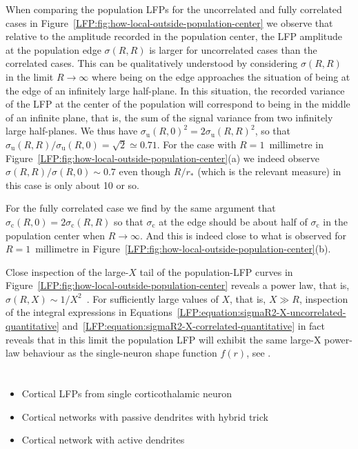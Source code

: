 When comparing the population LFPs for the uncorrelated and fully correlated cases in
Figure~\ref{LFP:fig:how-local-outside-population-center} we observe that 
relative to the amplitude recorded in the population center, the LFP amplitude at the 
population edge $\sigma(R,R)$ is larger for uncorrelated cases than the correlated cases.
This can be qualitatively understood by considering $\sigma(R,R)$ in the limit $R \rightarrow \infty$ where
being on the edge approaches the situation of being at the edge of an infinitely large half-plane. In this
situation, the recorded variance of the LFP at the center of the population will correspond to being in the middle
of an infinite plane, that is, the sum of the signal variance from two infinitely large half-planes. We thus have
$\sigma_\text{u}(R,0)^2=2\sigma_\text{u}(R,R)^2$, so that  $\sigma_\text{u}(R,R)/\sigma_\text{u}(R,0)=\sqrt{2} \simeq 0.71$. For the case with
$R=1$~millimetre in Figure~\ref{LFP:fig:how-local-outside-population-center}(a) we indeed observe 
$\sigma(R,R)/\sigma(R,0) \sim 0.7$ even though $R/r_*$ (which is the relevant measure) in this case
is only about 10 or so.

For the fully correlated case we find by the same argument that  $\sigma_\text{c}(R,0)=2\sigma_\text{c}(R,R)$ so that
$\sigma_\text{c}$ at the edge should be about half of  $\sigma_\text{c}$ in the population center when 
$R \rightarrow \infty$. And this is indeed close to what is observed for $R=1$~millimetre in 
Figure~\ref{LFP:fig:how-local-outside-population-center}(b). 

Close inspection of the large-$X$ tail of the population-LFP curves in Figure~\ref{LFP:fig:how-local-outside-population-center}
reveals a power law, that is, $\sigma(R,X) \sim 1/X^2$~\cite[Figure~3.9]{Einevoll2013a}. For sufficiently large values of $X$, that is,
$X \gg R$, inspection of the integral expressions in Equations~\ref{LFP:equation:sigmaR2-X-uncorrelated-quantitative}  
and~\ref{LFP:equation:sigmaR2-X-correlated-quantitative} in fact reveals that in this limit the population LFP will exhibit the 
same large-X power-law behaviour as the single-neuron shape function $f(r)$, see \cite{Einevoll2013a}.      


\section{}
\begin{itemize}
\item Cortical LFPs from single corticothalamic neuron \cite{Hagen2017}
\item Cortical networks with passive dendrites with hybrid trick \cite{Hagen2016}
\item Cortical network with active dendrites \cite{Reimann2013}
\end{itemize}

\section{} 
